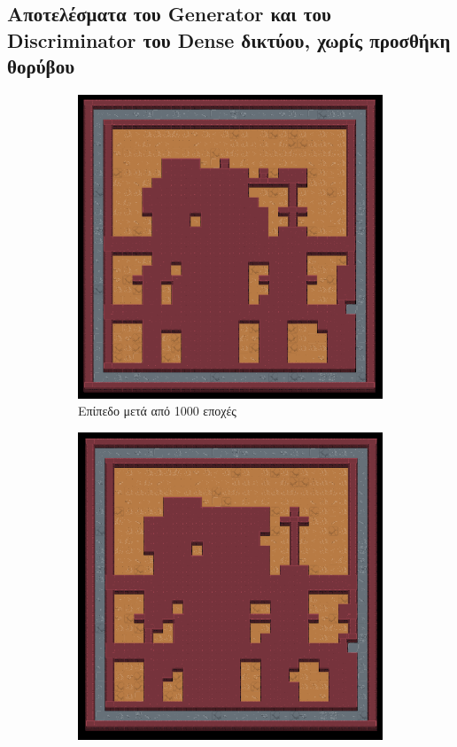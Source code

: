 \subsection{Αποτελέσματα του Generator και του Discriminator του Dense δικτύου, χωρίς προσθήκη θορύβου}
\begin{figure}[H]
\begin{subfigure}{.5\textwidth}
  \centering
  \includegraphics[width=.8\linewidth]{../images/result_images/dense-gan/generator_1000.png}
  \caption{Επίπεδο μετά από 1000 εποχές}
  \label{fig:sfig1}
\end{subfigure}%
\begin{subfigure}{.5\textwidth}
  \centering
  \includegraphics[width=.8\linewidth]{../images/result_images/dense-gan/generator_3000.png}

\end{subfigure}
\end{figure}
